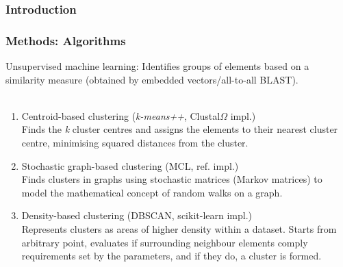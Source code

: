 \documentclass{beamer}
\begin{document}
\begin{frame}
\frametitle{Introduction}
\end{frame}

\begin{frame}
\frametitle{Methods: Algorithms}
Unsupervised machine learning: Identifies groups of elements based on a similarity measure (obtained by embedded vectors/all-to-all BLAST).\\~\\
\begin{enumerate}
\item<1-> Centroid-based clustering (\textit{k-means++}, Clustal$\Omega$ impl.)\\
Finds the \textit{k} cluster centres and assigns the elements to their nearest cluster centre, minimising squared distances from the cluster.
\item<2-> Stochastic graph-based clustering (MCL, ref. impl.)\\
Finds clusters in graphs using stochastic matrices (Markov matrices) to model the mathematical concept of random walks on a graph.
\item<3-> Density-based clustering (DBSCAN, scikit-learn impl.)\\
Represents clusters as areas of higher density within a dataset. Starts from arbitrary point, evaluates if surrounding neighbour elements comply requirements set by the parameters, and if they do, a cluster is formed.
\end{enumerate}
\end{frame}
\end{document}
